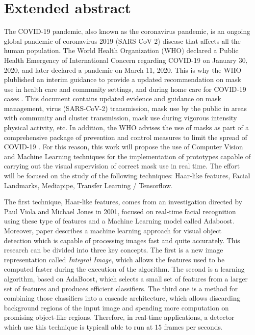 
\chapter*{Extended abstract}

\vspace{-1.1cm}
The COVID-19 pandemic, also known as the coronavirus pandemic, is an ongoing global pandemic of coronavirus 2019 (SARS-CoV-2) disease that affects all the human population. The World Health Organization (WHO) declared a Public Health Emergency of International Concern regarding COVID-19 on January 30, 2020, and later declared a pandemic on March 11, 2020. This is why the WHO plublished an interim guidance to provide a updated recommendation on mask use in health care and community settings, and during home care for COVID-19 cases \cite{covid19}. This document contains updated evidence and guidance on mask management, virus (SARS-CoV-2) transmission, mask use by the public in areas with community and cluster transmission, mask use during vigorous intensity physical activity, etc. In addition, the WHO advises the use of masks as part of a comprehensive package of prevention and control measures to limit the spread of COVID-19 \cite{oms}. For this reason, this work will propose the use of Computer Vision and Machine Learning techniques for the implementation of prototypes capable of carrying out the visual supervision of correct mask use in real time. The effort will be focused on the study of the following techniques: Haar-like features, Facial Landmarks, Mediapipe, Transfer Learning / Tensorflow.

The first technique, Haar-like features, comes from an investigation directed by Paul Viola and Michael Jones in 2001, focused on real-time facial recognition using these type of features and a Machine Learning model called Adaboost. Moreover, paper \cite{paulViola} describes a machine learning approach for visual object detection which is capable of processing images fast and quite accurately. This research can be divided into three key concepts. The first is a new image representation called \textit{Integral Image}, which allows the features used to be computed faster during the execution of the algorithm. The second is a learning algorithm, based on AdaBoost, which selects a small set of features from a larger set of features and produces efficient classifiers. The third one is a method for combining those classifiers into a cascade architecture, which allows discarding background regions of the input image and spending more computation on promising object-like regions. Therefore, in real-time applications, a detector which use this technique is typicall able to run at 15 frames per seconds.


